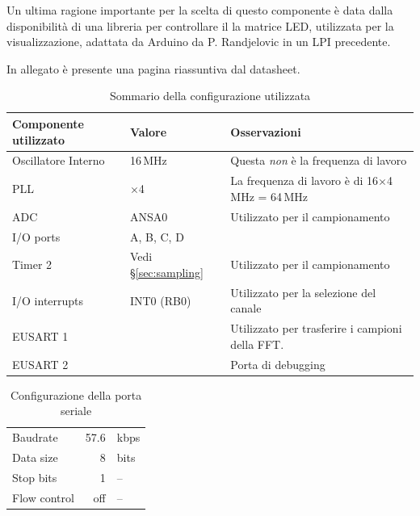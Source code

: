 Un ultima ragione importante per la scelta di questo componente \`e data dalla
disponibilit\`a di una libreria per controllare il la matrice LED, utilizzata
per la visualizzazione, adattata da Arduino da P. Randjelovic in un LPI
precedente.

In allegato \`e presente una pagina riassuntiva dal datasheet.

\begin{table}[H] \centering
    \caption{Sommario della configurazione utilizzata}
    \begin{tabularx}{\textwidth}{l l X}
        \toprule
        \bfseries Componente utilizzato & \bfseries Valore & \bfseries Osservazioni \\
        \midrule
        Oscillatore Interno & 16\,MHz & 
            Questa \emph{non} \`e la frequenza di lavoro \\
        PLL & \(\times\)4 & 
            La frequenza di lavoro \`e di 16\(\times\)4\,MHz = 64\,MHz \\
        ADC & \ttfamily ANSA0 &
            Utilizzato per il campionamento \\
        I/O ports & \ttfamily A, B, C, D & \\
        Timer 2 & Vedi \S\ref{sec:sampling} & Utilizzato per il campionamento \\
        I/O interrupts & \ttfamily INT0 (RB0) &
            Utilizzato per la selezione del canale \\
        EUSART 1 & & 
            Utilizzato per trasferire i campioni della FFT. \\
        EUSART 2 & &
            Porta di debugging \\
        \bottomrule
    \end{tabularx}
\end{table}

\begin{table}[H] \centering
    \caption{Configurazione della porta seriale}
    \begin{tabular}{l r l}
        \toprule
        Baudrate & 57.6 & kbps \\
        Data size & 8 & bits \\
        Stop bits & 1 & -- \\
        Flow control & off & -- \\
        \bottomrule
    \end{tabular}
\end{table}

